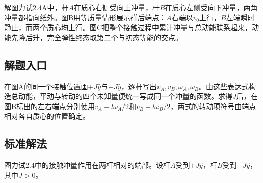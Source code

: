 \documentclass[UTF8,fontset=fandol,a4paper,11pt]{ctexart}
\begin{document}
解图力试2.4A中，杆$A$在质心右侧受向上冲量，杆$B$在质心左侧受向下冲量，两角冲量都指向纸外。图B用等质量情形展示碰后端点：$A$右端以$v_0$上行，$B$左端瞬时静止，而两个质心均上行。图C把整个接触过程中累计冲量与总动能联系起来，动能先降后升，完全弹性终态取第二个与初态等能的交点。



\subsection*{解题入口}

在图A的同一个接触位置画$+J\hat y$与$-J\hat y$，逐杆写出$v_A,v_B,\omega_A,\omega_B$。由这些表达式构造总动能，平动与转动的四个未知量便统一写成同一个冲量的函数。求得$J$后，在图B标出的左右端点分别使用$v_A+l\omega_A/2$和$v_B-l\omega_B/2$，两式的转动项符号由端点相对各自质心的位置确定。



\subsection*{标准解法}


图力试2.4中的接触冲量作用在两杆相对的端部。设杆$A$受到$+J\hat y$，杆$B$受到$-J\hat y$，其中$J>0$。
\end{document}
